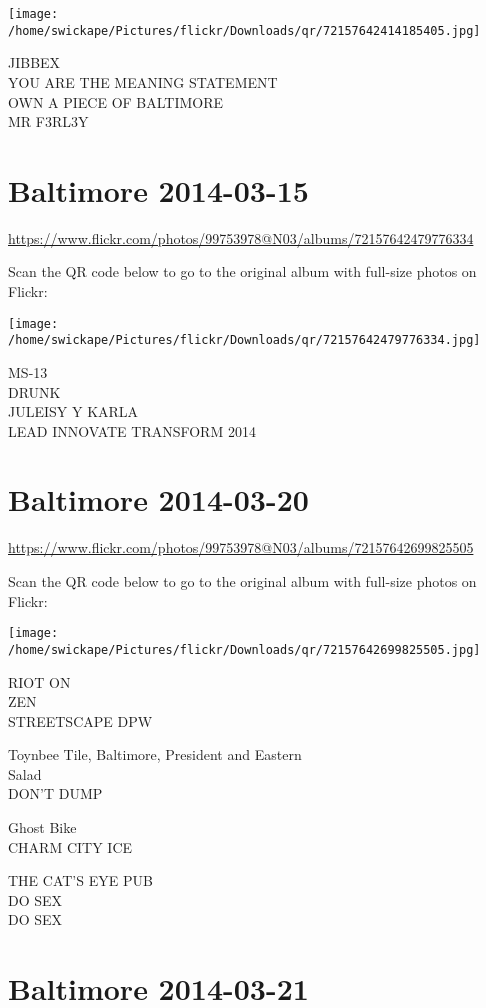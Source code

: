 \documentclass[10pt,letterpaper]{article}
\begin{document}
\texttt{[image: /home/swickape/Pictures/flickr/Downloads/qr/72157642414185405.jpg]}
\pagebreak

JIBBEX\\
YOU ARE THE MEANING STATEMENT\\
OWN A PIECE OF BALTIMORE\\
MR F3RL3Y
\pagebreak

\section*{Baltimore 2014-03-15}

\url{https://www.flickr.com/photos/99753978@N03/albums/72157642479776334}

Scan the QR code below to go to the original album with full-size photos on Flickr:

\texttt{[image: /home/swickape/Pictures/flickr/Downloads/qr/72157642479776334.jpg]}
\pagebreak

MS{-}13\\
DRUNK\\
JULEISY Y KARLA\\
LEAD INNOVATE TRANSFORM 2014
\pagebreak

\section*{Baltimore 2014-03-20}

\url{https://www.flickr.com/photos/99753978@N03/albums/72157642699825505}

Scan the QR code below to go to the original album with full-size photos on Flickr:

\texttt{[image: /home/swickape/Pictures/flickr/Downloads/qr/72157642699825505.jpg]}
\pagebreak

RIOT ON\\
ZEN\\
STREETSCAPE DPW

Toynbee Tile, Baltimore, President and Eastern\\
Salad\\
DON'T DUMP

Ghost Bike\\
CHARM CITY ICE

THE CAT'S EYE PUB\\
DO SEX\\
DO SEX
\pagebreak

\section*{Baltimore 2014-03-21}
\end{document}
